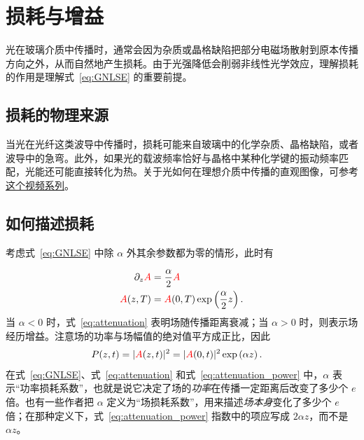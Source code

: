\chapter{损耗与增益}
\label{ch:attenuation}


光在玻璃介质中传播时，通常会因为杂质或晶格缺陷把部分电磁场散射到原本传播方向之外，从而自然地产生损耗。由于光强降低会削弱非线性光学效应，理解损耗的作用是理解式~\ref{eq:GNLSE} 的重要前提。


\section{损耗的物理来源}
当光在光纤这类波导中传播时，损耗可能来自玻璃中的化学杂质、晶格缺陷，或者波导中的急弯。此外，如果光的载波频率恰好与晶格中某种化学键的振动频率匹配，光能还可能直接转化为热。关于光如何在理想介质中传播的直观图像，可参考 \href{https://www.youtube.com/watch?v=QCX62YJCmGk&list=PLZHQObOWTQDMKqfyUvG2kTlYt-QQ2x-ui}{这个视频系列}。


\section{如何描述损耗}

考虑式~\ref{eq:GNLSE} 中除 $\alpha$ 外其余参数都为零的情形，此时有

\begin{align}
    \label{eq:attenuation}
    \partial_z\textcolor{red}{A} &= \frac{\alpha}{2} \textcolor{red}{A} \\ \nonumber
    \textcolor{red}{A}(z,T)&=\textcolor{red}{A}(0,T)\exp\left( \frac{\alpha}{2}z \right).
\end{align}
当 $\alpha<0$ 时，式~\ref{eq:attenuation} 表明场随传播距离衰减；当 $\alpha>0$ 时，则表示场经历增益。注意场的功率与场幅值的绝对值平方成正比，因此
\begin{align}
    \label{eq:attenuation_power}
    P(z,t)=|\textcolor{red}{A}(z,t)|^2&=|\textcolor{red}{A}(0,t)|^2 \exp\left( \alpha z \right).
\end{align}
在式~\ref{eq:GNLSE}、式~\ref{eq:attenuation} 和式~\ref{eq:attenuation_power} 中，$\alpha$ 表示“功率损耗系数”，也就是说它决定了场的\emph{功率}在传播一定距离后改变了多少个 $e$ 倍。也有一些作者把 $\alpha$ 定义为“场损耗系数”，用来描述\emph{场本身}变化了多少个 $e$ 倍；在那种定义下，式~\ref{eq:attenuation_power} 指数中的项应写成 $2\alpha z$，而不是 $\alpha z$。

